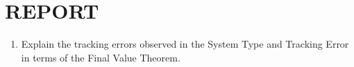 \documentclass[11pt,a4paper]{article}
\begin{document}
\section{REPORT}

\begin{enumerate}

\item Explain the tracking errors observed in the System Type and Tracking Error in terms of the Final Value Theorem.







\end{enumerate}
\end{document}
